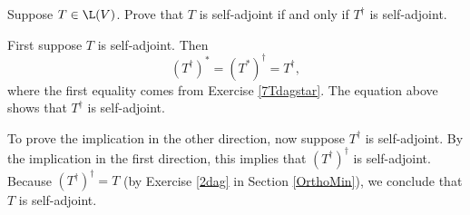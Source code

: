 \exercise
Suppose $T \in \L(V)$. Prove that $T$ is self-adjoint if and only if $T^\dagger$ is self-adjoint.

\begin{Solution}
First suppose $T$ is self-adjoint. Then
\[
{(T^\dagger)}^* = {(T^*)}^\dagger = T^\dagger,
\]
where the first equality comes from Exercise \ref{7Tdagstar}. The equation above shows that $T^\dagger$ is self-adjoint.

To prove the implication in the other direction, now suppose $T^\dagger$ is self-adjoint. By the implication in the first direction, this implies that ${(T^\dagger)}^\dagger$ is self-adjoint. Because ${(T^\dagger)}^\dagger = T$ (by Exercise \ref{2dag} in Section \ref{OrthoMin}), we conclude that $T$ is self-adjoint.
\end{Solution}

